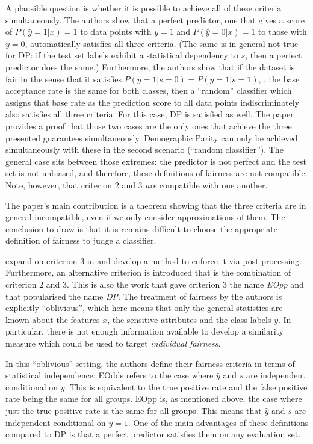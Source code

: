 A plausible question is whether it is possible to achieve all of these criteria simultaneously.
The authors show that a perfect predictor,
\ie one that gives a score of \(P(\hat{y}=1|x) = 1\) to data points with \(y=1\)
and \(P(\hat{y}=0|x) = 1\) to those with \(y=0\),
automatically satisfies all three criteria.
(The same is in general not true for \ac{DP}:
if the test set labels exhibit a statistical dependency to $s$, then a perfect predictor does the same.)
Furthermore, the authors show that if the dataset is fair in the sense that it satisfies \(P(y=1|s=0) = P(y=1|s=1)\),
\ie, the base acceptance rate is the same for both classes,
then a ``random'' classifier which assigns that base rate as the prediction score to all data points indiscriminately
also satisfies all three criteria.
For this case, \ac{DP} is satisfied as well.
The paper provides a proof
that those two cases are the only ones that achieve the three presented guarantees simultaneously.
Demographic Parity can only be achieved simultaneously with these in the second scenario (``random classifier'').
The general case sits between those extremes:
the predictor is not perfect and the test set is not unbiased,
and therefore, these definitions of fairness are not compatible.
Note, however, that criterion 2 and 3 \emph{are} compatible with one another.

The paper's main contribution is a theorem showing that the three criteria are in general incompatible,
even if we only consider approximations of them.
The conclusion to draw is
that it is remains difficult to choose the appropriate definition of fairness to judge a classifier.

\citet{hardt2016equality} expand on criterion 3 in \citet{kleinberg2016inherent}
and develop a method to enforce it via post-processing.
Furthermore, an alternative criterion is introduced that is the combination of criterion 2 and 3.
This is also the work that gave criterion 3 the name \emph{\acl{EOpp}}
and that popularised the name \emph{\acl{DP}}.
The treatment of fairness by the authors is explicitly ``oblivious'',
which here means that only the general statistics are known
about the features \(x\), the sensitive attributes and the class labels \(y\).
In particular, there is not enough information available to develop a similarity measure
which could be used to target \emph{individual fairness}.

In this ``oblivious'' setting, the authors define their fairness criteria in terms of statistical independence:
\acf{EOdds} refers to the case where \(\hat{y}\) and \(s\) are independent conditional on \(y\).
This is equivalent to the true positive rate and the false positive rate being the same for all groups.
\Acf{EOpp} is, as mentioned above,
the case where just the true positive rate is the same for all groups.
This means that \(\hat{y}\) and \(s\) are independent conditional on \(y=1\).
One of the main advantages of these definitions compared to \ac{DP} is that a perfect predictor satisfies them on any evaluation set.

